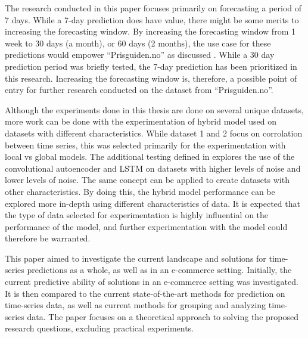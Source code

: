 The research conducted in this paper focuses primarily on forecasting a period of 7 days.
While a 7-day prediction does have value,
there might be some merits to increasing the forecasting window.
By increasing the forecasting window from 1 week to 30 days (a month), or 60 days (2 months),
the use case for these predictions would empower ``Prisguiden.no'' as discussed .
While a 30 day prediction period was briefly tested,
the 7-day prediction has been prioritized in this research.
Increasing the forecasting window is, therefore, a possible point of entry for further research conducted on the
dataset from ``Prisguiden.no''.


Although the experiments done in this thesis are done on several unique datasets,
more work can be done with the experimentation of hybrid model used on datasets with different characteristics.
While dataset 1 and 2 focus on corrolation between time series, this was selected primarily for the experimentation with local vs global models.
The additional testing defined in  explores the use of the convolutional autoencoder and LSTM
on datasets with higher levels of noise and lower levels of noise.
The same concept can be applied to create datasets with other characteristics.
By doing this, the hybrid model performance can be explored more in-depth using different characteristics of data.
It is expected that the type of data selected for experimentation is highly influential on the performance of the model,
and further experimentation with the model could therefore be warranted.




\iffalse
This paper aimed to investigate the current landscape and solutions for time-series predictions as a whole,
as well as in an e-commerce setting.
Initially, the current predictive ability of solutions in an e-commerce setting was investigated.
It is then compared to the current state-of-the-art methods for prediction on time-series data,
as well as current methods for grouping and analyzing time-series data.
The paper focuses on a theoretical approach to solving the proposed research questions,
excluding practical experiments.

